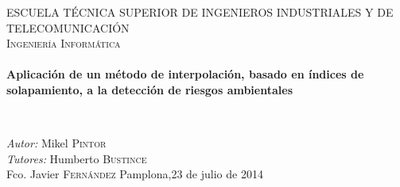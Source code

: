 \begin{titlepage}
\begin{center}
\textsc{\LARGE ESCUELA TÉCNICA SUPERIOR DE INGENIEROS INDUSTRIALES Y DE TELECOMUNICACIÓN}\\[1.5cm]

\textsc{\Large Ingeniería Informática}\\[0.5cm]

\HRule \\[0.4cm]
{ \huge \bfseries Aplicación de un método de interpolación, basado en índices de solapamiento, a la detección de riesgos ambientales\\[0.4cm] }

\HRule \\[1.5cm]

\vfill
\hfill
\begin{minipage}{0.4\textwidth}
\begin{flushright} \large
\emph{Autor:} Mikel \textsc{Pintor}\\
\emph{Tutores:} Humberto \textsc{Bustince}\\
Fco. Javier \textsc{Fernández}
{\large Pamplona,23 de julio de 2014}
\end{flushright}
\end{minipage}
\vfill

\end{center}
\end{titlepage}